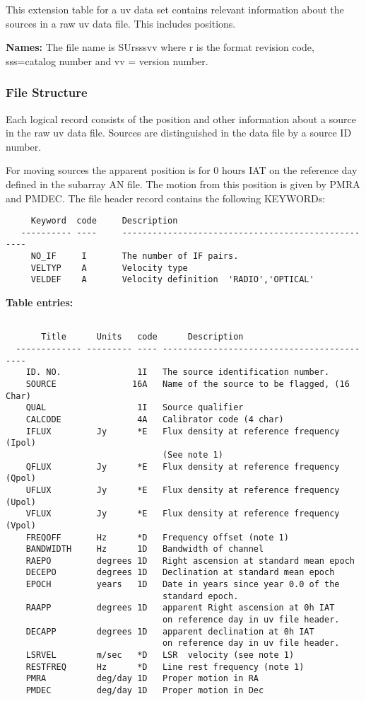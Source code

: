    This extension table for a uv data set contains relevant information
about the sources in a raw uv data file.  This includes positions.


{\bf Names:} The file name is SUrsssvv where r is the format revision
code, sss=catalog number and vv = version number.

\subsubsection{File Structure}

     Each logical record consists of the position and other information
about a source in the raw uv data file.  Sources are distinguished in
the data file by a source ID number.

     For moving sources the apparent position is for 0 hours IAT on the
reference day defined in the subarray AN file.  The motion from this
position is given by PMRA and PMDEC.  The file header record contains
the following KEYWORDs:

\begin{verbatim}
     Keyword  code     Description
   ---------- ----     ---------------------------------------------------
     NO_IF     I       The number of IF pairs.
     VELTYP    A       Velocity type
     VELDEF    A       Velocity definition  'RADIO','OPTICAL'

\end{verbatim}
{\bf Table entries:}
\begin{verbatim}

       Title      Units   code      Description
  ------------- --------- ---- -------------------------------------------
    ID. NO.               1I   The source identification number.
    SOURCE               16A   Name of the source to be flagged, (16 Char)
    QUAL                  1I   Source qualifier
    CALCODE               4A   Calibrator code (4 char)
    IFLUX         Jy      *E   Flux density at reference frequency (Ipol)
                               (See note 1)
    QFLUX         Jy      *E   Flux density at reference frequency (Qpol)
    UFLUX         Jy      *E   Flux density at reference frequency (Upol)
    VFLUX         Jy      *E   Flux density at reference frequency (Vpol)
    FREQOFF       Hz      *D   Frequency offset (note 1)
    BANDWIDTH     Hz      1D   Bandwidth of channel
    RAEPO         degrees 1D   Right ascension at standard mean epoch
    DECEPO        degrees 1D   Declination at standard mean epoch
    EPOCH         years   1D   Date in years since year 0.0 of the
                               standard epoch.
    RAAPP         degrees 1D   apparent Right ascension at 0h IAT
                               on reference day in uv file header.
    DECAPP        degrees 1D   apparent declination at 0h IAT
                               on reference day in uv file header.
    LSRVEL        m/sec   *D   LSR  velocity (see note 1)
    RESTFREQ      Hz      *D   Line rest frequency (note 1)
    PMRA          deg/day 1D   Proper motion in RA
    PMDEC         deg/day 1D   Proper motion in Dec

\end{verbatim}
